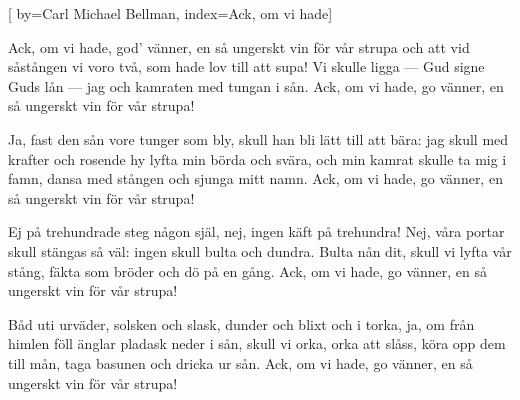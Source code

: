 [
	by={Carl Michael Bellman},
	index={Ack, om vi hade}]
	
\beginverse*						
Ack, om vi hade, god' vänner, en så
ungerskt vin för vår strupa
och att vid såstången vi voro två,
som hade lov till att supa!
Vi skulle ligga — Gud signe Guds lån —
jag och kamraten med tungan i sån.
Ack, om vi hade, go vänner, en så
ungerskt vin för vår strupa!
\endverse		

\beginverse*						
Ja, fast den sån vore tunger som bly,
skull han bli lätt till att bära:
jag skull med krafter och rosende hy
lyfta min börda och svära,
och min kamrat skulle ta mig i famn,
dansa med stången och sjunga mitt namn.
Ack, om vi hade, go vänner, en så
ungerskt vin för vår strupa!
\endverse	

\beginverse*						
Ej på trehundrade steg någon själ,
nej, ingen käft på trehundra!
Nej, våra portar skull stängas så väl:
ingen skull bulta och dundra.
Bulta nån dit, skull vi lyfta vår stång,
fäkta som bröder och dö på en gång.
Ack, om vi hade, go vänner, en så
ungerskt vin för vår strupa!
\endverse	

\beginverse*						
Båd uti urväder, solsken och slask,
dunder och blixt och i torka,
ja, om från himlen föll änglar pladask
neder i sån, skull vi orka,
orka att slåss, köra opp dem till mån,
taga basunen och dricka ur sån.
Ack, om vi hade, go vänner, en så
ungerskt vin för vår strupa!
\endverse					
\endsong		

